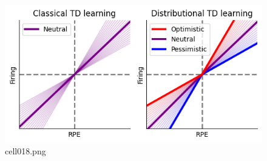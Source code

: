 \begin{figure}[ht]
	\centering
	\includegraphics[scale=0.8, max width=\linewidth]{./fig/bayesian-brain/quantile-expectile-regression/cell018.png}
	\caption{cell018.png}
	\label{cell018.png}
\end{figure}